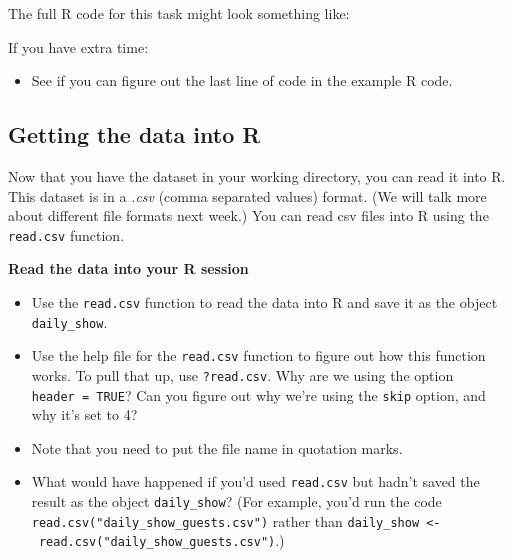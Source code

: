 \documentclass[]{book}
\makeatletter
\newenvironment{Shaded}{\begin{snugshade}}{\end{snugshade}}
\newcommand{\KeywordTok}[1]{\textcolor[rgb]{0.13,0.29,0.53}{\textbf{#1}}}
\newcommand{\StringTok}[1]{\textcolor[rgb]{0.31,0.60,0.02}{#1}}
\newcommand{\OperatorTok}[1]{\textcolor[rgb]{0.81,0.36,0.00}{\textbf{#1}}}
\newcommand{\NormalTok}[1]{#1}
\providecommand{\tightlist}{%
  \setlength{\itemsep}{0pt}\setlength{\parskip}{0pt}}
\newenvironment{kframe}{%
\medskip{}
\setlength{\fboxsep}{.8em}
 \def\at@end@of@kframe{}%
 \ifinner\ifhmode%
  \def\at@end@of@kframe{\end{minipage}}%
  \begin{minipage}{\columnwidth}%
 \fi\fi%
 \def\FrameCommand##1{\hskip\@totalleftmargin \hskip-\fboxsep
 \colorbox{shadecolor}{##1}\hskip-\fboxsep
     \hskip-\linewidth \hskip-\@totalleftmargin \hskip\columnwidth}%
 \MakeFramed {\advance\hsize-\width
   \@totalleftmargin\z@ \linewidth\hsize
   \@setminipage}}%
 {\par\unskip\endMakeFramed%
 \at@end@of@kframe}
\renewenvironment{Shaded}{\begin{kframe}}{\end{kframe}}
\theoremstyle{definition}
\theoremstyle{definition}
\theoremstyle{definition}
\theoremstyle{remark}
\makeatother
\begin{document}
The full R code for this task might look something like:

\begin{Shaded}
\end{Shaded}

If you have extra time:

\begin{itemize}
\tightlist
\item
  See if you can figure out the last line of code in the example R code.
\end{itemize}

\subsection{Getting the data into R}\label{getting-the-data-into-r}

Now that you have the dataset in your working directory, you can read it
into R. This dataset is in a \emph{.csv} (comma separated values)
format. (We will talk more about different file formats next week.) You
can read csv files into R using the \texttt{read.csv} function.

\textbf{Read the data into your R session}

\begin{itemize}
\tightlist
\item
  Use the \texttt{read.csv} function to read the data into R and save it
  as the object \texttt{daily\_show}.
\item
  Use the help file for the \texttt{read.csv} function to figure out how
  this function works. To pull that up, use \texttt{?read.csv}. Why are
  we using the option \texttt{header\ =\ TRUE}? Can you figure out why
  we're using the \texttt{skip} option, and why it's set to 4?
\item
  Note that you need to put the file name in quotation marks.
\item
  What would have happened if you'd used \texttt{read.csv} but hadn't
  saved the result as the object \texttt{daily\_show}? (For example,
  you'd run the code \texttt{read.csv("daily\_show\_guests.csv")} rather
  than
  \texttt{daily\_show\ \textless{}-\ read.csv("daily\_show\_guests.csv")}.)
\end{itemize}
\end{document}
